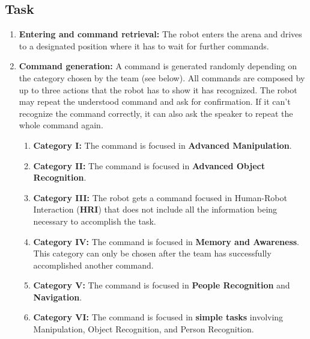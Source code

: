 \subsection{Task}

\begin{enumerate}
	\item \textbf{Entering and command retrieval:} The robot enters the arena and drives to a designated position where it has to wait for further commands. \\

	\item \textbf{Command generation:} A command is generated randomly depending on the category chosen by the team (see below). All commands are composed by up to three actions that the robot has to show it has recognized. The robot may repeat the understood command and ask for confirmation. If it can't recognize the command correctly, it can also ask the speaker to repeat the whole command again.

	\begin{enumerate}
		\item \textbf{Category I:} The command is focused in \textbf{Advanced Manipulation}.

		\item \textbf{Category II:} The command is focused in \textbf{Advanced Object Recognition}.

		\item \textbf{Category III:} The robot gets a command focused in Human-Robot Interaction (\textbf{HRI}) that does not include all the information being necessary to accomplish the task.

		\item \textbf{Category IV:} The command is focused in \textbf{Memory and Awareness}. This category can only be chosen after the team has successfully accomplished another command.

		\item \textbf{Category V:} The command is focused in \textbf{People Recognition} and \textbf{Navigation}.

		\item \textbf{Category VI:} The command is focused in \textbf{simple tasks} involving Manipulation, Object Recognition, and Person Recognition.

	\end{enumerate}




\end{enumerate}
